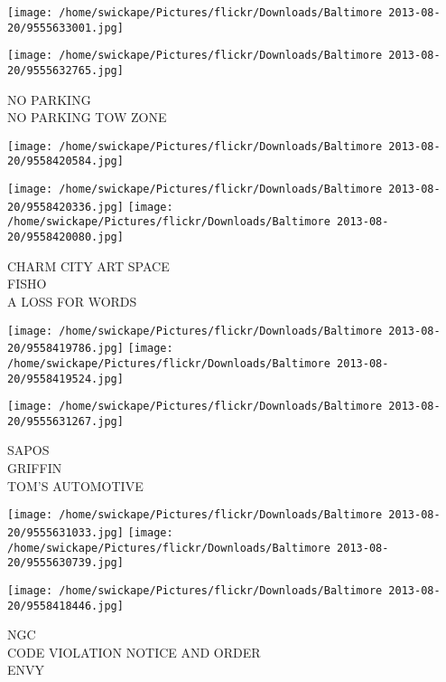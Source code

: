 \documentclass[10pt,letterpaper]{article}
\begin{document}
\texttt{[image: /home/swickape/Pictures/flickr/Downloads/Baltimore 2013-08-20/9555633001.jpg]}

\vspace{0.25in}
\texttt{[image: /home/swickape/Pictures/flickr/Downloads/Baltimore 2013-08-20/9555632765.jpg]}

NO PARKING\\
NO PARKING TOW ZONE\\
\pagebreak

\texttt{[image: /home/swickape/Pictures/flickr/Downloads/Baltimore 2013-08-20/9558420584.jpg]}

\vspace{0.25in}
\texttt{[image: /home/swickape/Pictures/flickr/Downloads/Baltimore 2013-08-20/9558420336.jpg]}
\texttt{[image: /home/swickape/Pictures/flickr/Downloads/Baltimore 2013-08-20/9558420080.jpg]}

CHARM CITY ART SPACE\\
FISHO\\
A LOSS FOR WORDS\\
\pagebreak

\texttt{[image: /home/swickape/Pictures/flickr/Downloads/Baltimore 2013-08-20/9558419786.jpg]}
\texttt{[image: /home/swickape/Pictures/flickr/Downloads/Baltimore 2013-08-20/9558419524.jpg]}

\vspace{0.25in}
\texttt{[image: /home/swickape/Pictures/flickr/Downloads/Baltimore 2013-08-20/9555631267.jpg]}

SAPOS\\
GRIFFIN\\
TOM'S AUTOMOTIVE\\
\pagebreak

\texttt{[image: /home/swickape/Pictures/flickr/Downloads/Baltimore 2013-08-20/9555631033.jpg]}
\texttt{[image: /home/swickape/Pictures/flickr/Downloads/Baltimore 2013-08-20/9555630739.jpg]}

\vspace{0.25in}
\texttt{[image: /home/swickape/Pictures/flickr/Downloads/Baltimore 2013-08-20/9558418446.jpg]}

NGC\\
CODE VIOLATION NOTICE AND ORDER\\
ENVY\\
\pagebreak
\end{document}
